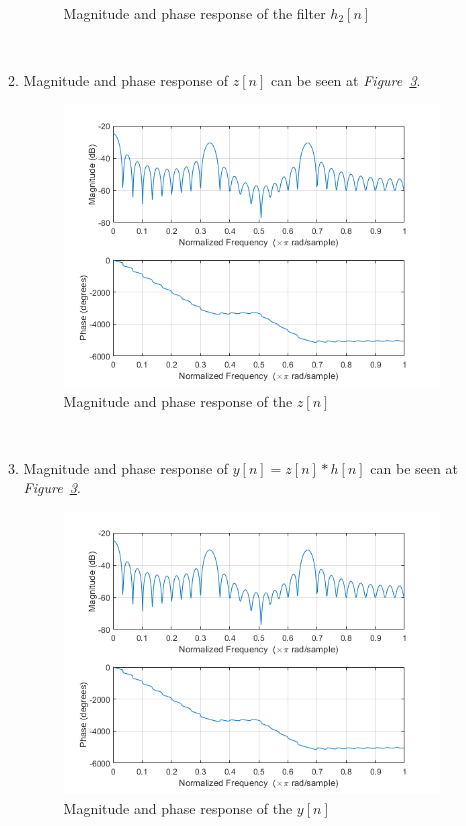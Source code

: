 \documentclass[a4paper,12pt]{article}
\begin{document}
\begin{enumerate}
\begin{enumerate}
\begin{figure}[H]
					\caption{\label{fig:q13e} Magnitude and phase response of the filter $h_2[n]$  }
				\end{figure}
				 \-\\[6cm]
			\item Magnitude and phase response of $z[n]$ can be seen at \textit{Figure~\ref{fig:q13f}}.
				\begin{figure}[H]
					\centering
					\setlength{\unitlength}{\textwidth} 
					\includegraphics[width=0.9\unitlength]{q13f}
					\caption{\label{fig:q13f} Magnitude and phase response of the  $z[n]$  }
				\end{figure}
				 \-\\[1cm]
			\item Magnitude and phase response of $y[n]=z[n]*h[n]$ can be seen at \textit{Figure~\ref{fig:q13f}}.
				\begin{figure}[H]
					\centering
					\setlength{\unitlength}{\textwidth} 
					\includegraphics[width=0.9\unitlength]{q13f}
					\caption{\label{fig:q13f} Magnitude and phase response of the  $y[n]$  }
				\end{figure}
				
			

\end{enumerate}
\end{enumerate}
\end{document}
